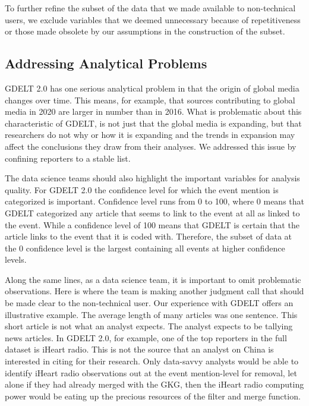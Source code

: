 \documentclass[preprint,authoryear,12pt]{elsarticle/elsarticle}
\begin{document}
To further refine the subset of the data that we made available to non-technical users, we exclude variables that we deemed unnecessary because of repetitiveness or those made obsolete by our assumptions in the construction of the subset. 

\subsection{Addressing Analytical Problems} 
GDELT 2.0 has one serious analytical problem in that the origin of global media changes over time. This means, for example, that sources contributing to global media in 2020 are larger in number than in 2016. What is problematic about this characteristic of GDELT, is not just that the global media is expanding, but that researchers do not why or how it is expanding and the trends in expansion may affect the conclusions they draw from their analyses. We addressed this issue by confining reporters to a stable list. 

The data science teams should also highlight the important variables for analysis quality. For GDELT 2.0 the confidence level for which the event mention is categorized is important. Confidence level runs from 0 to 100, where 0 means that GDELT categorized any article that seems to link to the event at all as linked to the event. While a confidence level of 100 means that GDELT is certain that the article links to the event that it is coded with. Therefore, the subset of data at the 0 confidence level is the largest containing all events at higher confidence levels.  

Along the same lines, as a data science team, it is important to omit problematic observations. Here is where the team is making another judgment call that should be made clear to the non-technical user. Our experience with GDELT offers an illustrative example. The average length of many articles was one sentence. This short article is not what an analyst expects. The analyst expects to be tallying news articles. In GDELT 2.0, for example, one of the top reporters in the full dataset is iHeart radio. This is not the source that an analyst on China is interested in citing for their research. Only data-savvy analysts would be able to identify iHeart radio observations out at the event mention-level for removal, let alone if they had already merged with the GKG, then the iHeart radio computing power would be eating up the precious resources of the filter and merge function. 
\end{document}
